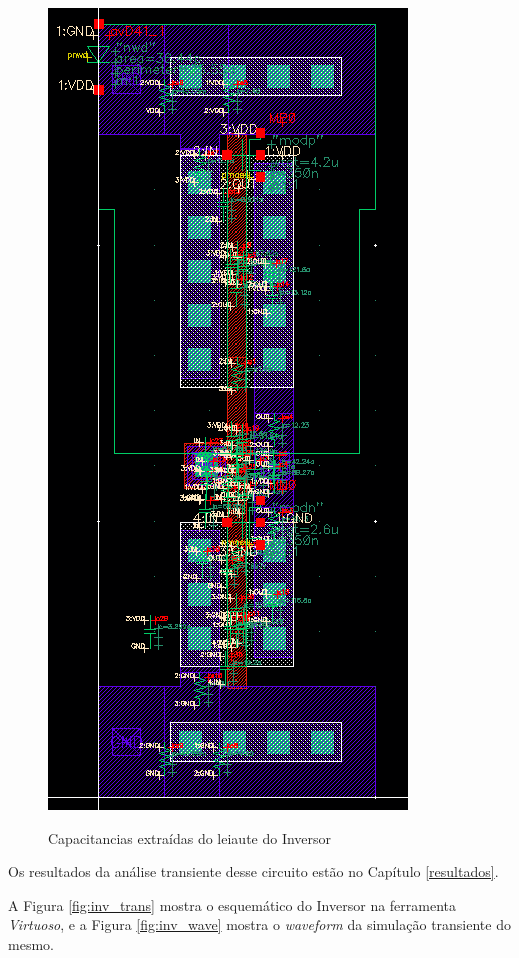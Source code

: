 \documentclass{iiufrgs}
\newcommand{\virtuoso}{\textit{Virtuoso}}
\begin{document}
\begin{figure}[htbp]
    \centering
    \caption{Capacitancias extraídas do leiaute do Inversor}
    \includegraphics[scale=0.75]{images/extracted_inv.png}
    \label{fig:inv_capacitancias}
\end{figure}

\FloatBarrier

Os resultados da análise transiente desse circuito estão no Capítulo \ref{resultados}.\

A Figura \ref{fig:inv_trans} mostra o esquemático do Inversor na ferramenta \virtuoso, e a Figura \ref{fig:inv_wave} mostra o \textit{waveform} da simulação transiente do mesmo.
\end{document}
